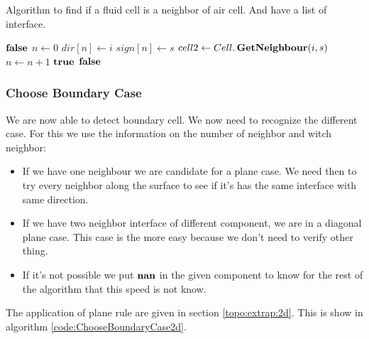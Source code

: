 \begin{algorithm}
\caption{Algorithm to find if a fluid cell is a neighbor of air cell. And have a list of interface.}\label{code:IsBoundary}
\begin{algorithmic}[1]
\State   \Return $\mathop{\textbf{false}}$ 
\EndIf
\State $n\gets 0$
 
 
\State $dir[n]\gets i$ 
\State $sign[n]\gets s$ 
		\State $cell2 \gets Cell.\mathop{\textbf{GetNeighbour}}(i,s)$
			\State $n\gets n+1$ 
		\EndIf
		\EndIf
\EndFor
\EndFor
{}
\State \Return $\mathop{\textbf{true}}$ 
\EndIf
\State \Return $\mathop{\textbf{false}}$ 
\EndFunction
\end{algorithmic}
\end{algorithm}


\subsubsection{Choose Boundary Case}
We are now able to detect boundary cell. We now need to recognize the different case.
For this we use the information on the number of neighbor and witch neighbor:
\begin{itemize}
\item If we have one neighbour we are candidate for a plane case. We need then to try every neighbor along the surface to
see if it's has the same interface with same direction.
\item  If we have two neighbor interface of different component, we are in a diagonal plane case.
This case is the more easy because we don't need to verify other thing.
\item If it's not possible we put $\mathop{\textbf{nan}}$ in the given component to know for the rest of the algorithm that this speed is not know.
\end{itemize}
The application of plane rule are given in section \ref{topo:extrap:2d}.
This is show in algorithm \ref{code:ChooseBoundaryCase2d}.


